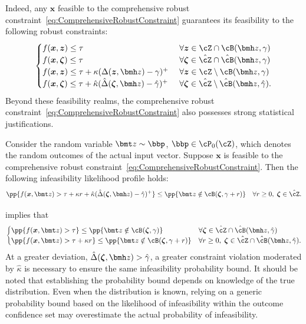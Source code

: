 \documentclass[mnsc, nonblindrev]{informswp}
\newcommand{\1}[1]{\mathds{1}{\left(#1\right)}}
\begin{document}
Indeed, any $\bm x$ feasible to the comprehensive robust constraint~\eqref{eq:ComprehensiveRobustConstraint} guarantees its feasibility to the following robust constraints:
$$
\begin{cases}
f(\bm x, \bm z) \leq \tau &~\forall \bm z \in \cZ \cap \cB(\bmh z, \gamma) \\
f(\bm x, \bm \zeta) \leq \tau &~\forall \bm \zeta \in \hat \cZ \cap \hat \cB(\bmh z, \gamma) \\
f(\bm x,\bm z) \leq \tau +  \kappa (\Delta(\bm z,\bmh z) - \gamma)^+ &~\forall \bm z \in \cZ \setminus  \cB(\bmh z, \gamma) \\
f(\bm x,\bm \zeta) \leq \tau +  \hat \kappa (\hat \Delta(\bm \zeta,\bmh z) - \hat \gamma)^+ &~\forall  \bm\zeta \in \hat \cZ \setminus \hat \cB(\bmh z, \hat \gamma). 
\end{cases}
$$
Beyond these feasibility realms, the comprehensive robust constraint~\eqref{eq:ComprehensiveRobustConstraint} also possesses strong statistical justifications.

\begin{theorem}
\label{thm:StatisticalJustification}
Consider the random variable $\bmt z\sim \bbp$, $\bbp \in \cP_0(\cZ)$, which denotes the random outcomes of the actual input vector. Suppose $\bm x$ is feasible to the comprehensive robust constraint~\eqref{eq:ComprehensiveRobustConstraint}. Then the following infeasibility likelihood profile holds:
$$
\pp{f(\bm x,\bmt z) > \tau + \kappa r  + \hat \kappa (\hat \Delta(\bm \zeta,\bmh z) - \hat \gamma)^+ } \leq  \pp{\bmt z \notin \cB(\bm \zeta,\gamma+r)} ~~~\forall r \geq 0, \; \bm \zeta \in \hat \cZ.
$$
\end{theorem}

 implies that 
$$
\begin{cases}
\pp{f(\bm x,\bmt z) > \tau } \leq   \pp{\bmt z \notin \cB(\bm \zeta,\gamma)} & \forall \bm \zeta \in\hat \cZ \cap \hat \cB(\bmh z, \hat \gamma) \\
\pp{f(\bm x,\bmt z) > \tau + \kappa r } \leq  \pp{\bmt z \notin \cB(\bm \zeta,\gamma+r)} & \forall r \geq 0, \; \bm \zeta \in\hat \cZ \cap \hat \cB(\bmh z, \hat \gamma).
\end{cases}
$$
At a greater deviation, $\hat \Delta(\bm \zeta,\bmh z)>\hat \gamma$, a greater constraint violation moderated by $\hat \kappa$ is necessary to ensure the same infeasibility probability bound. It should be noted that establishing the probability bound depends on knowledge of the true distribution. Even when the distribution is known, relying on a generic probability bound based on the likelihood of infeasibility within the outcome confidence set may overestimate the actual probability of infeasibility. 
\end{document}
